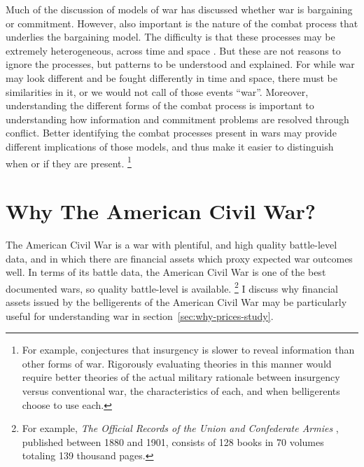 Much of the discussion of models of war has discussed whether war is bargaining or commitment.
However, also important is the nature of the combat process that underlies the bargaining model. %
The difficulty is that these processes may be extremely heterogeneous, across time and space \parencite{Reiter2003}.
But these are not reasons to ignore the processes, but patterns to be understood and explained. %
For while war may look different and be fought differently in time and
space, there must be similarities in it, or we would not call of those events ``war''. %
Moreover, understanding the different forms of the combat process is important to understanding how information and commitment problems are resolved through conflict. %
Better identifying the combat processes present in wars may provide different implications of those models, and thus make it easier to
distinguish when or if they are present.%
\footnote{%
  For example, \textcite{Walter2009} conjectures that insurgency is slower to reveal information than other forms of war. %
  Rigorously evaluating theories in this manner would require better theories of the actual military rationale between insurgency versus conventional war, the characteristics of each, and when belligerents choose to use each.
} %



\section{Why The American Civil War?}
\label{sec:why-american-civil}

The American Civil War is a war with plentiful, and high quality battle-level data, and in which there are financial assets which proxy expected war outcomes well.
In terms of its battle data, the American Civil War is one of the best documented wars, so quality battle-level is available.%
\footnote{%
  For example, \textit{The Official Records of the Union and  Confederate Armies} \parencites{US1901}, published between 1880 and 1901, consists of 128 books in 70 volumes totaling 139 thousand pages.

} %
I discuss why financial assets issued by the belligerents of the American Civil War may be particularly useful for understanding war in section~\ref{sec:why-prices-study}.

